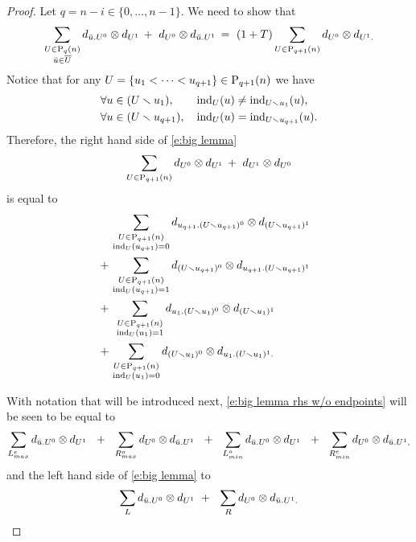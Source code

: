 \begin{proof}
	Let $q = n-i \in \{0, \dots, n-1\}$.
	We need to show that
	\begin{equation} \label{e:big lemma}
	\sum_{\substack{U \in \P_{q}(n) \\ \bu \in \overline{U}}} d_{\bu.U^0} \ot d_{U^1}\, +\ d_{U^0} \ot d_{\bu.U^1}\, = \
	(1+T) \sum_{U \in \P_{q+1}(n)} d_{U^0} \ot d_{U^1.}
	\end{equation}
	Notice that for any $U = \{u_1 < \cdots < u_{q+1}\} \in \P_{q+1}(n)$ we have
	\begin{align*}
	& \forall u \in (U \sm u_1), \qquad \ind_{U}(u) \neq \ind_{U \sm u_1}(u), \\
	& \forall u \in (U \sm u_{q+1}), \quad \ind_{U}(u) = \ind_{U \sm u_{q+1}}(u).
	\end{align*}
	Therefore, the right hand side of \eqref{e:big lemma}
	\begin{equation} \label{e:big lemma rhs}
	\sum_{U \in \P_{q+1}(n)} d_{U^0} \ot d_{U^1}\, +\ d_{U^1} \ot d_{U^0}
	\end{equation}
	is equal to
	\begin{equation} \label{e:big lemma rhs w/o endpoints}
	\begin{split}
	&\, \sum_{\substack{U \in \P_{q+1}(n) \\ \ind_U(u_{q+1}) = 0}}
	d_{u_{q+1}.(U \sm u_{q+1})^0} \ot d_{(U \sm u_{q+1})^1}\ \ \\ +
	&\, \sum_{\substack{U \in \P_{q+1}(n) \\ \ind_U(u_{q+1}) =1}}
	d_{(U \sm u_{q+1})^0} \ot d_{u_{q+1}.(U \sm u_{q+1})^1} \\ +
	&\ \,\sum_{\substack{U \in \P_{q+1}(n) \\ \ind_U(u_1) = 1}} d_{u_1.(U \sm u_1)^0} \ot d_{(U\sm u_1)^1} \quad \\ +
	&\, \sum_{\substack{U \in \P_{q+1}(n) \\ \ind_U(u_1) = 0}} d_{(U \sm u_1)^0} \ot d_{u_1.(U\sm u_1)^1.}
	\end{split}
	\end{equation}

	With notation that will be introduced next, \eqref{e:big lemma rhs w/o endpoints} will be seen to be equal to
	\begin{equation*}
	\sum_{{L}_{max}^{e}} d_{\bu.U^0} \ot d_{U^1}\ \ +\ \
	\sum_{{R}_{max}^{o}} d_{U^0} \ot d_{\bu.U^1}\ \ +\ \
	\sum_{{L}_{min}^{o}} d_{\bu.U^0} \ot d_{U^1}\ \ +\ \
	\sum_{{R}_{min}^{e}} d_{U^0} \ot d_{\bu.U^1,}
	\end{equation*}
	and the left hand side of \eqref{e:big lemma} to
	\begin{equation*}
	\sum_{L} d_{\bu.U^0} \ot d_{U^1}\ +\ \
	\sum_{R} d_{U^0} \ot d_{\bu.U^1.}
	\end{equation*}


\end{proof}
